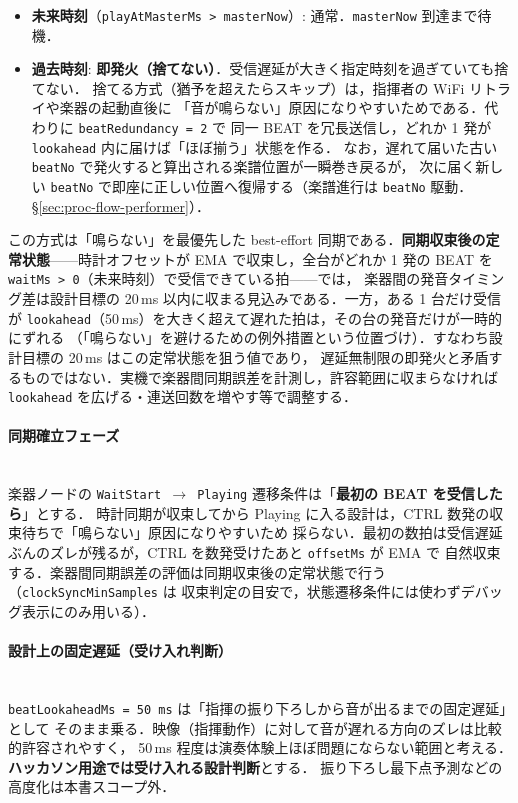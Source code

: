 \documentclass[lualatex,book,paper=a4paper,jafontsize=11.5pt,jafontscale=1.05]{jlreq}
\begin{document}
\begin{itemize}
  \item \textbf{未来時刻}（\texttt{playAtMasterMs > masterNow}）: 通常．\texttt{masterNow} 到達まで待機．
  \item \textbf{過去時刻}: \textbf{即発火（捨てない）}．受信遅延が大きく指定時刻を過ぎていても捨てない．
        捨てる方式（猶予を超えたらスキップ）は，指揮者の WiFi リトライや楽器の起動直後に
        「音が鳴らない」原因になりやすいためである．代わりに \texttt{beatRedundancy = 2} で
        同一 BEAT を冗長送信し，どれか 1 発が \texttt{lookahead} 内に届けば「ほぼ揃う」状態を作る．
        なお，遅れて届いた古い \texttt{beatNo} で発火すると算出される楽譜位置が一瞬巻き戻るが，
        次に届く新しい \texttt{beatNo} で即座に正しい位置へ復帰する（楽譜進行は \texttt{beatNo} 駆動．\S\ref{sec:proc-flow-performer}）．
\end{itemize}

この方式は「鳴らない」を最優先した best-effort 同期である．\textbf{同期収束後の定常状態}——時計オフセットが
EMA で収束し，全台がどれか 1 発の BEAT を \texttt{waitMs > 0}（未来時刻）で受信できている拍——では，
楽器間の発音タイミング差は設計目標の 20\,ms 以内に収まる見込みである．一方，ある 1 台だけ受信が
\texttt{lookahead}（50\,ms）を大きく超えて遅れた拍は，その台の発音だけが一時的にずれる
（「鳴らない」を避けるための例外措置という位置づけ）．すなわち設計目標の 20\,ms はこの定常状態を狙う値であり，
遅延無制限の即発火と矛盾するものではない．実機で楽器間同期誤差を計測し，許容範囲に収まらなければ
\texttt{lookahead} を広げる・連送回数を増やす等で調整する．

\paragraph{同期確立フェーズ}\mbox{}\\
楽器ノードの \texttt{WaitStart $\to$ Playing} 遷移条件は「\textbf{最初の BEAT を受信したら}」とする．
時計同期が収束してから Playing に入る設計は，CTRL 数発の収束待ちで「鳴らない」原因になりやすいため
採らない．最初の数拍は受信遅延ぶんのズレが残るが，CTRL を数発受けたあと \texttt{offsetMs} が EMA で
自然収束する．楽器間同期誤差の評価は同期収束後の定常状態で行う（\texttt{clockSyncMinSamples} は
収束判定の目安で，状態遷移条件には使わずデバッグ表示にのみ用いる）．

\paragraph{設計上の固定遅延（受け入れ判断）}\mbox{}\\
\texttt{beatLookaheadMs = 50\,ms} は「指揮の振り下ろしから音が出るまでの固定遅延」として
そのまま乗る．映像（指揮動作）に対して音が遅れる方向のズレは比較的許容されやすく，
50\,ms 程度は演奏体験上ほぼ問題にならない範囲と考える．\textbf{ハッカソン用途では受け入れる設計判断}とする．
振り下ろし最下点予測などの高度化は本書スコープ外．
\end{document}
